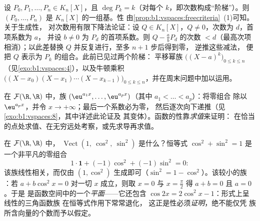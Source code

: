 \begin{example}[阶梯原理]
\label{ex:b1:vspaces:staircase}
设 $P_0, P_1, \dots, P_n \in K_n[X]$，且 $\deg P_k = k$（对每个
$k$，即次数构成“阶梯”）。则 $(P_0, \dots, P_n)$ 是
$K_n[X]$ 的一组基。性
由\cref{prop:b1:vspaces:freecriteria}~(1)可知。关于生成性，
对次数用有限下降法论证：设 $Q \in
K_n[X]$，$Q \neq 0$，次数为 $d$，首项系数为 $a$，
并设 $b \neq 0$ 为 $P_d$ 的首项系数。则 $Q -
\frac ab P_d$ 的次数 $< d$（最高次项相消）；以此差替换
$Q$ 并反复进行，至多 $n + 1$ 步后得到零，
逆推这些减法，
便把 $Q$ 表示为 $P_k$ 的组合。此前已见过两个阶梯：
平移幂族 $\bigl((X-a)^k\bigr)_{0 \leq k
\leq n}$（见\cref{exo:b1:vspaces:4}），以及牛顿乘积
$\bigl((X - x_0)(X - x_1)\cdots(X - x_{k-1})\bigr)_{0 \leq k \leq
n}$，并在周末问题中加以运用。
\end{example}

\begin{example}[函数空间中的线性无关性]\label{ex:b1:vspaces:functionfree}
在 $\mathcal{F}(\R,\R)$ 中，族 $(\eu^{a_1 x}, \dots, \eu^{a_p
x})$（其中 $a_1 < \dots < a_p$）：将零组合
除以 $\eu^{a_p x}$，并令 $x \to +\infty$；最后一个系数必为零，
然后逐次向下递推（见\cref{exo:b1:vspaces:8}，其中详述此论证及
其变体）。函数的性靠\emph{求值}来证明：
在恰当的点处求值、在无穷远处考察，或先求导再求值。
\end{example}

\begin{example}[隐藏的关系使张成的子空间变小]
\label{ex:b1:vspaces:hiddenrelation}
在 $\mathcal{F}(\R, \R)$ 中，
$\operatorname{Vect}(1,\ \cos^2,\ \sin^2)$ 是什么？恒等式
$\cos^2 + \sin^2 = 1$ 是一个非平凡的零组合
\[
1\cdot\mathbf{1} + (-1)\cos^2 + (-1)\sin^2 = 0 :
\]
该族线性相关，而仅由
$(1, \cos^2)$ 生成即可（$\sin^2 = 1 - \cos^2$）。该较小的族
：若 $a + b\cos^2 x = 0$ 对一切 $x$ 成立，则取 $x = 0$ 与
$x = \frac\pi2$ 得 $a + b = 0$ 且 $a = 0$。于是
是函数空间中的一个\emph{平面}——它还包含
$\cos 2x = 2\cos^2 x - 1$：形式上呈线性的三角函数族
在恒等式作用下常常退化，
这正是性必须\emph{证明}，绝不能仅凭
族所含向量的个数而予以假定。
\end{example}

